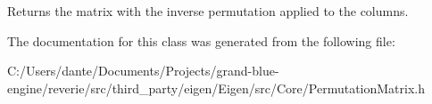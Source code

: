 \begin{DoxyReturn}{Returns}
the matrix with the inverse permutation applied to the columns. 
\end{DoxyReturn}


The documentation for this class was generated from the following file\+:\begin{DoxyCompactItemize}
\item 
C\+:/\+Users/dante/\+Documents/\+Projects/grand-\/blue-\/engine/reverie/src/third\+\_\+party/eigen/\+Eigen/src/\+Core/Permutation\+Matrix.\+h\end{DoxyCompactItemize}
